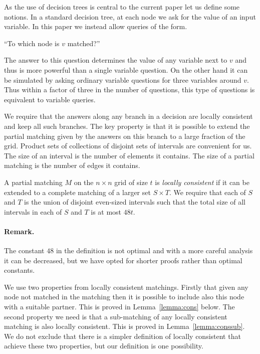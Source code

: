 \documentclass{theoretics}
\begin{document}
As the use of decision trees is central to the current
paper let us define some notions.
In a standard decision tree, at each node we ask for 
the value of an input variable.  In this paper we instead allow
queries of the form.
\begin{center}
``To which node is $v$ matched?''
\end{center}

The answer to this question determines the value
of any variable next to $v$ and thus is more powerful
than a single variable question.  On the other hand 
it can be simulated by asking
ordinary variable questions for three variables
around $v$.  Thus within a factor of three in the
number of questions, this type of questions is equivalent
to variable queries.

We require that the answers along any branch in a decision
are locally consistent and keep all such branches.
The key property is that it is possible to extend
the partial matching given by the answers on this branch
to a large fraction of the grid. 
Product sets of collections of disjoint sets
of intervals are convenient for us.
The size of an interval is the number of elements
it contains.  The size of a partial matching is the
number of edges it contains.

\begin{definition}\label{def:consistent}
A partial matching $M$ on the $n \times n$ grid of
size $t$ is {\em locally consistent} 
if it can be extended to a complete
matching of a larger set $S \times T$.
We require that each of $S$ and $T$ is the union
of disjoint even-sized intervals such that the total
size of all intervals in each of $S$ and $T$ is at most $48t$.
\end{definition}

\paragraph{Remark.}  The constant $48$ in the definition is not optimal
and with a more careful analysis it can be decreased, but we
have opted for shorter proofs rather than optimal constants.

\medskip
We use two properties from locally consistent
matchings.  Firstly that given any node not matched
in the matching then it is possible to include
also this node with a suitable partner.  This is proved
in Lemma~\ref{lemma:cons} below.   The second property 
we need is that a sub-matching of any locally consistent
matching is also locally consistent.  This is proved
in Lemma~\ref{lemma:conssub}.  We do not exclude
that there is a simpler definition of locally consistent 
that achieve these two properties, but our
definition is one possibility.
\end{document}
